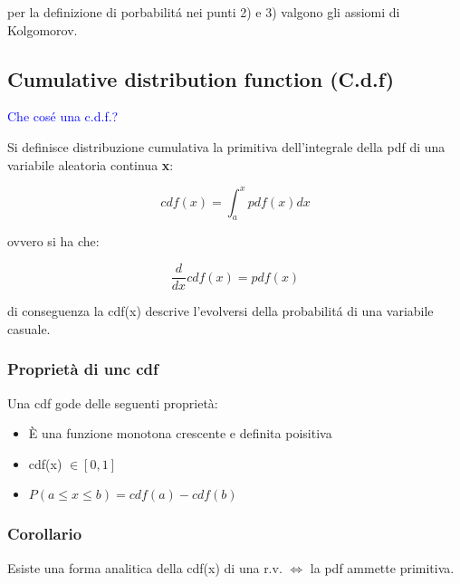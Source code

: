 \documentclass[11pt,a4paper]{book}
\begin{document}
 \noindent per la definizione di porbabilit\'{a} nei punti 2) e 3) valgono gli assiomi di Kolgomorov.
 
 
\begin{figure}[!ht]
	\vspace{0.2in}
    \centering
    \qquad
\end{figure}

\subsection{Cumulative distribution function (C.d.f)}

\textcolor{blue}{Che cos\'{e} una c.d.f.?} \newline

Si definisce distribuzione cumulativa la primitiva dell'integrale della pdf di una variabile aleatoria continua \textbf{x}:

\begin{equation}
	cdf(x) = \int_{a}^{x}{pdf(x)dx}
\end{equation}

\noindent ovvero si ha che:

\begin{equation}
	\dfrac{d}{dx}cdf(x)  = pdf(x)
\end{equation}

di conseguenza la cdf(x) descrive l'evolversi della probabilit\'{a} di una variabile casuale.
\subsubsection{Propriet\`{a} di unc cdf}
Una cdf gode delle seguenti propriet\`{a}:
\begin{itemize}
	\item \`{E} una funzione monotona crescente  e definita poisitiva 
	\item cdf(x) $\in [0,1]$
	\item $P(a \leq x \leq b) = cdf(a) - cdf(b)$ 
\end{itemize}
\subsubsection{Corollario}

Esiste una forma analitica della cdf(x) di una r.v. $\iff$ la pdf ammette primitiva. 

\begin{figure}[!ht]
	\vspace{0.2in}
    \centering
    \qquad
\end{figure}
\newpage
\end{document}
